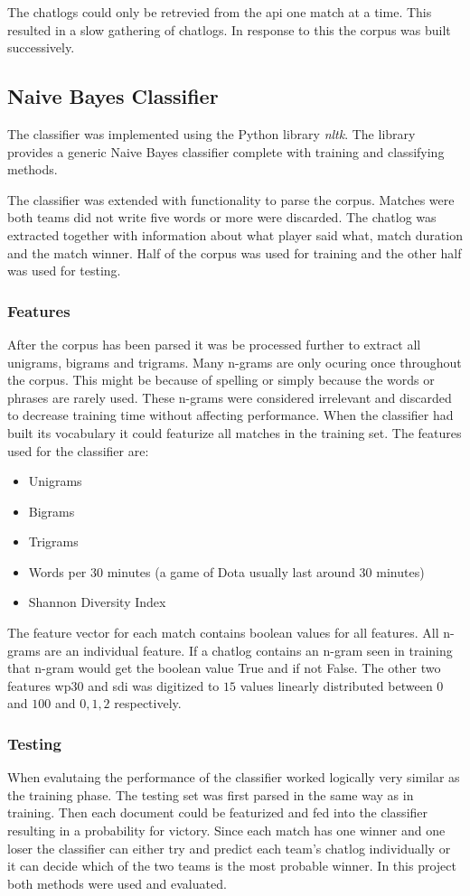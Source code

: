 \documentclass[12pt,a4paper]{article}
\begin{document}
The chatlogs could only be retrevied from the api one match at a time.
This resulted in a slow gathering of chatlogs.
In response to this the corpus was built successively.

\subsection{Naive Bayes Classifier}
The classifier was implemented using the Python library \textit{nltk}.
The library provides a generic Naive Bayes classifier complete with training and classifying methods.

The classifier was extended with functionality to parse the corpus.
Matches were both teams did not write five words or more were discarded.
The chatlog was extracted together with information about what player said what,
match duration and the match winner.
Half of the corpus was used for training and the other half was used for testing.

\subsubsection{Features}
\label{sec:feats}
After the corpus has been parsed it was be processed further to extract all unigrams, bigrams and trigrams.
Many n-grams are only ocuring once throughout the corpus.
This might be because of spelling or simply because the words or phrases are rarely used.
These n-grams were considered irrelevant and discarded to decrease training time without affecting performance.
When the classifier had built its vocabulary it could featurize all matches in the training set.
The features used for the classifier are:
\begin{itemize}
    \item Unigrams
    \item Bigrams
    \item Trigrams
    \item Words per 30 minutes (a game of Dota usually last around 30 minutes)
    \item Shannon Diversity Index
\end{itemize}
The feature vector for each match contains boolean values for all features. All n-grams are an individual feature.
If a chatlog contains an n-gram seen in training that n-gram would get the boolean value True and if not False.
The other two features wp30 and sdi was digitized to $15$ values linearly distributed between $0$ and $100$
and $0, 1, 2$ respectively.

\subsubsection{Testing}
When evalutaing the performance of the classifier worked logically very similar as the training phase.
The testing set was first parsed in the same way as in training.
Then each document could be featurized and fed into the classifier resulting in a probability for victory.
Since each match has one winner and one loser the classifier can either try and predict each team's chatlog individually
or it can decide which of the two teams is the most probable winner.
In this project both methods were used and evaluated.
\end{document}
